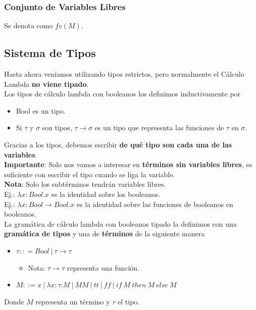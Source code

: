 \documentclass[10pt,a4paper]{article}
\begin{document}
\subsubsection{Conjunto de Variables Libres}
Se denota como $fv(M)$.
\subsection{Sistema de Tipos}
Hasta ahora veníamos utilizando tipos estrictos, pero normalmente el Cálculo Lambda \textbf{no viene tipado}. \\
Los tipos de cálculo lambda con booleanos los definimos inductivamente por 
\begin{itemize}
    \item Bool es un tipo.
    \item Si $\tau$ y $\sigma$ son tipos, $\tau \rightarrow \sigma$ es un tipo que representa las funciones de $\tau$ en $\sigma$.
\end{itemize}
Gracias a los tipos, debemos escribir \textbf{de qué tipo son cada una de las variables}. \\
\textbf{Importante}: Solo nos vamos a interesar en \textbf{términos sin variables libres}, es suficiente con escribir el tipo cuando se liga la variable. \\
\textbf{Nota}: Solo los subtérminos tendrán variables libres. \\
Ej.: $\lambda x:Bool . x$ es la identidad sobre los booleanos. \\
Ej.: $\lambda x:Bool \rightarrow Bool.x$ es la identidad sobre las funciones de booleanos en booleanos. \\

La gramática de cálculo lambda con booleanos tipado la definimos con una \textbf{gramática de tipos} y una de \textbf{términos} de la siguiente manera
\begin{itemize}
    \item $\tau :: = Bool \ | \ \tau \rightarrow \tau$
    \begin{itemize}
        \item Nota: $\tau \rightarrow \tau$ representa una función.
    \end{itemize}
    \item $M ::= x \ | \ \lambda x: \tau . M \ | \ M M \ | \ tt \ | \ ff \ | \ if \ M \ then \ M \ else \ M$
\end{itemize}
Donde $M$ representa un término y $\tau$ el tipo. \\
\end{document}
